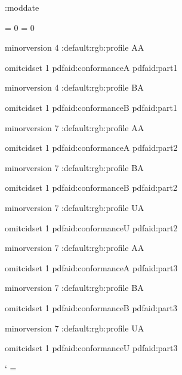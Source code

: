 
\newtoks\setembeddedfilesmoddate
    \setembeddedfilesmoddate{}
\newtoks\embeddedfiles:moddate
\def\minim:makedefaultmoddate{%
    \expandafter\edef\expandafter
        \minim:tmp\expandafter{\the\setembeddedfilesmoddate}%
    \embeddedfiles:moddate\expandafter{\minim:tmp}}


\newcount \pdfaconformancelevel
\pdfaconformancelevel = 0
\newcount \pdfuaconformancelevel
\pdfuaconformancelevel = 0

\def\pdfalevel#1#2{%
    \minim:pdfalinkattr{ /F 4}%
    \global\pdfaconformancelevel=#1\relax
    \ifcsname minim:pdfa:#1#2\endcsname \lastnamedcs\else
        \errmessage{Unknown pdf/a standard pdf/a-#1}\fi}

\def\minim:pdfasettings#1#2#3{%
    \pdfvariable minorversion #1\relax
    \minim:default:rgb:profile
    \if#2A\writedocumentstructure1\fi
    
    \pdfvariable omitcidset 1
    \setmetadata pdfaid:conformance{#2}%
    \setmetadata pdfaid:part{#3}}

\expandafter\def\csname minim:pdfa:1a\endcsname{\minim:pdfasettings 4A1}
\expandafter\def\csname minim:pdfa:1b\endcsname{\minim:pdfasettings 4B1}
\expandafter\def\csname minim:pdfa:2a\endcsname{\minim:pdfasettings 7A2}
\expandafter\def\csname minim:pdfa:2b\endcsname{\minim:pdfasettings 7B2}
\expandafter\def\csname minim:pdfa:2u\endcsname{\minim:pdfasettings 7U2}
\expandafter\def\csname minim:pdfa:3a\endcsname{\minim:pdfasettings 7A3}
\expandafter\def\csname minim:pdfa:3b\endcsname{\minim:pdfasettings 7B3}
\expandafter\def\csname minim:pdfa:3u\endcsname{\minim:pdfasettings 7U3}

\def\pdfualevel{
    \setmetadata pdfuaid:part {1}
    \tagging:enablepdfua
    \global\pdfuaconformancelevel= }


\catcode`\: = \minimpdfloaded

